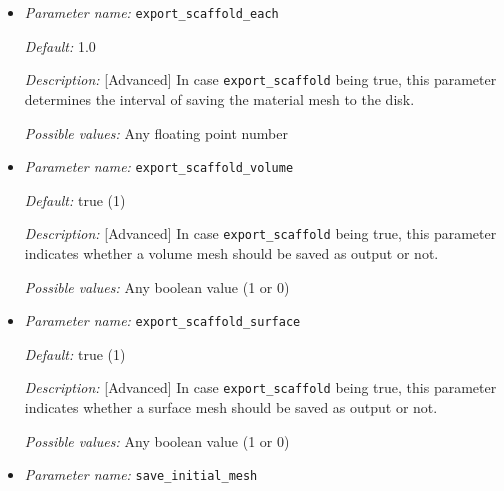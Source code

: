 \begin{itemize}

{\it Default:} false (0)

{\it Description:} [Advanced] Indicates if the degrading material should be exported as a single entity for further analysis like in a structural mechanics simulation. It works based on Mmg level set meshing.

{\it Possible values:} Any boolean value (1 or 0)


\item {\it Parameter name:} {\tt export\_scaffold\_each}
\label{parameters:export_scaffold_each}


{\it Default:} 1.0

{\it Description:} [Advanced] In case {\tt export\_scaffold} being true, this parameter determines the interval of saving the material mesh to the disk.

{\it Possible values:} Any floating point number


\item {\it Parameter name:} {\tt export\_scaffold\_volume}
\label{parameters:export_scaffold_volume}


{\it Default:} true (1)

{\it Description:} [Advanced] In case {\tt export\_scaffold} being true, this parameter indicates whether a volume mesh should be saved as output or not.

{\it Possible values:} Any boolean value (1 or 0)


\item {\it Parameter name:} {\tt export\_scaffold\_surface}
\label{parameters:export_scaffold_surface}


{\it Default:} true (1)

{\it Description:} [Advanced] In case {\tt export\_scaffold} being true, this parameter indicates whether a surface mesh should be saved as output or not.

{\it Possible values:} Any boolean value (1 or 0)


\item {\it Parameter name:} {\tt save\_initial\_mesh}
\label{parameters:save_initial_mesh}


\end{itemize}

